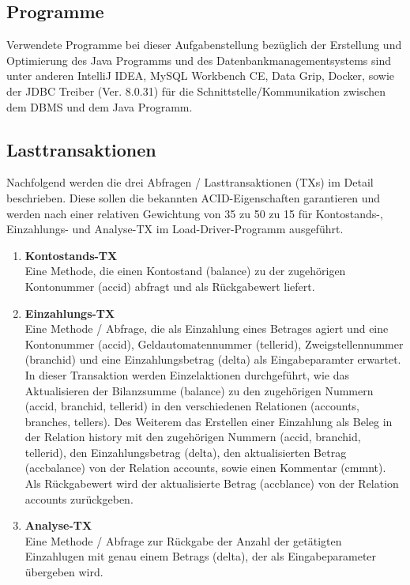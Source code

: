 \subsection{Programme}\label{subsec:programme}
Verwendete Programme bei dieser Aufgabenstellung bezüglich der Erstellung und Optimierung des Java Programms und des Datenbankmanagementsystems sind unter anderen IntelliJ IDEA, MySQL Workbench CE, Data Grip, Docker, sowie der JDBC Treiber (Ver. 8.0.31) für die Schnittstelle/Kommunikation zwischen dem DBMS und dem Java Programm.
\subsection{Lasttransaktionen}\label{subsec:lasttransaktionen}
Nachfolgend werden die drei Abfragen / Lasttransaktionen (TXs) im Detail beschrieben.
Diese sollen die bekannten ACID-Eigenschaften garantieren und werden nach einer relativen Gewichtung von 35 zu 50 zu 15 für Kontostands-, Einzahlungs- und Analyse-TX im Load-Driver-Programm ausgeführt.
\begin{enumerate}
    \item \textbf{Kontostands-TX} \\
    Eine Methode, die einen Kontostand (balance) zu der zugehörigen Kontonummer (accid) abfragt und als Rückgabewert liefert.
    \item \textbf{Einzahlungs-TX} \\
    Eine Methode / Abfrage, die als Einzahlung eines Betrages agiert und eine Kontonummer (accid), Geldautomatennummer (tellerid), Zweigstellennummer (branchid) und eine Einzahlungsbetrag (delta) als Eingabeparamter erwartet.
    In dieser Transaktion werden Einzelaktionen durchgeführt, wie das Aktualisieren der Bilanzsumme (balance) zu den zugehörigen Nummern (accid, branchid, tellerid) in den verschiedenen Relationen (accounts, branches, tellers).
    Des Weiterem das Erstellen einer Einzahlung als Beleg in der Relation history mit den zugehörigen Nummern (accid, branchid, tellerid), den Einzahlungsbetrag (delta), den aktualisierten Betrag (accbalance) von der Relation accounts, sowie einen Kommentar (cmmnt).
    Als Rückgabewert wird der aktualisierte Betrag (accblance) von der Relation accounts zurückgeben.
    \item \textbf{Analyse-TX} \\
    Eine Methode / Abfrage zur Rückgabe der Anzahl der getätigten Einzahlugen mit genau einem Betrags (delta), der als Eingabeparameter übergeben wird.
\end{enumerate}
